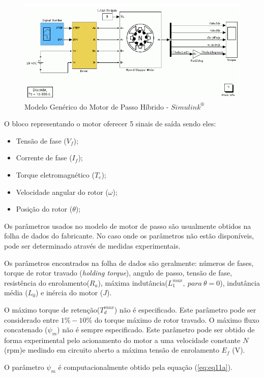 \begin{figure}[H]
	\centering
	\includegraphics[scale=.42]{Images/modeloEE_HSM.PNG}
	\caption{ Modelo Genérico do Motor de Passo Híbrido - $Simulink^{\circledR}$ }
	\label{fig:fig2}
\end{figure}

O bloco representando o motor oferecer 5 sinais de saída sendo eles:

\begin{itemize}
	\item Tensão de fase ($V_f$);
	\item Corrente de fase ($I_f$);
	\item Torque eletromagnético ($T_e$);
	\item Velocidade angular do rotor ($\omega$);
	\item Posição do rotor ($\theta$);
\end{itemize}

Os parâmetros usados no modelo de motor de passo são usualmente obtidos na folha de dados do fabricante. No caso onde os parâmetros não estão disponíveis, pode ser determinado através de medidas experimentais.

Os parâmetros encontrados na folha de dados são geralmente: números de fases, torque de rotor travado (\textit{holding torque}), angulo de passo, tensão de fase, resistência do enrolamento($R_a$), máxima indutância($L_1^{max},\ para\ \theta=0$), indutância média ($L_0$) e inércia do motor ($J$).

O máximo torque de retenção($T_d^{max}$) não é especificado. Este parâmetro pode  ser considerado entre $1\%-10\%$ do torque máximo de rotor travado. O máximo fluxo concatenado ($\psi_m$) não é sempre especificado. Este parâmetro pode ser obtido de forma experimental pelo acionamento do motor a uma velocidade constante $N$ (rpm)e medindo em circuito aberto a máxima tensão de enrolamento $E_f$ (V).

O parâmetro $\psi_m$ é computacionalmente obtido pela equação (\ref{eq:eq11a}).

